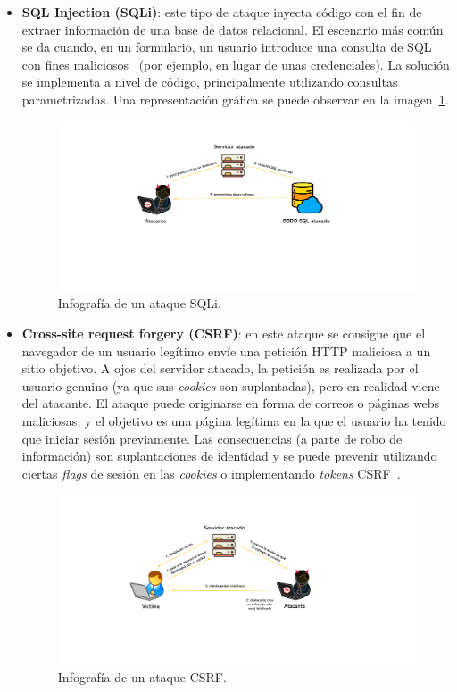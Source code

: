 \begin{itemize}
	\item \textbf{SQL Injection (SQLi)}: este tipo de ataque inyecta código con el fin de extraer información de una base de datos relacional. El escenario más común se da cuando, en un formulario, un usuario introduce una consulta de SQL con fines maliciosos~\cite{sqlIw3school} (por ejemplo, en lugar de unas credenciales). La solución se implementa a nivel de código, principalmente utilizando consultas parametrizadas. Una representación gráfica se puede observar en la imagen~\ref{img:sqli}.
	
\begin{figure}[h]
	\caption[Ataques \textit{web}: SQLi]{Infografía de un ataque SQLi.}
	\label{img:sqli}
	\centering
	\includegraphics[width=\textwidth]{../img/memoria/3_sqli.pdf}
\end{figure}

	\item \textbf{Cross-site request forgery (CSRF)}: en este ataque se consigue que el navegador de un usuario legítimo envíe una petición HTTP maliciosa a un sitio objetivo. A ojos del servidor atacado, la petición es realizada por el usuario genuino (ya que sus \textit{cookies} son suplantadas), pero en realidad viene del atacante. El ataque puede originarse en forma de correos o páginas webs maliciosas, y el objetivo es una página legítima en la que el usuario ha tenido que iniciar sesión previamente. Las consecuencias (a parte de robo de información) son suplantaciones de identidad y se puede prevenir utilizando ciertas \textit{flags} de sesión en las \textit{cookies} o implementando \textit{tokens} CSRF~\cite{csrfatatus}.
	
	\begin{figure}[h]
		\caption[Ataques \textit{web}: CSRF]{Infografía de un ataque CSRF.}
		\label{img:csrf}
		\centering
		\includegraphics[width=\textwidth]{../img/memoria/3_csrf.pdf}
	\end{figure}
	

\end{itemize}
